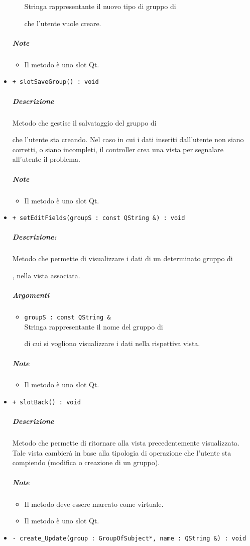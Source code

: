 \begin{itemize}
\begin{itemize}
\color{black} Stringa rappresentante il nuovo tipo di gruppo di \subject{} che l'utente vuole creare.
			\end{itemize}
			\subparagraph{Note}
			\begin{itemize}
				\item Il metodo è uno slot\g{} Qt\g{}.
			\end{itemize}
			\item \color{blue} \verb!+ slotSaveGroup() : void!
			\color{black}
			\subparagraph{Descrizione} Metodo che gestise il salvataggio del gruppo di \subject{} che l'utente sta creando. Nel caso in cui i dati inseriti dall'utente non siano corretti, o siano incompleti, il controller crea una vista per segnalare all'utente il problema.
			\subparagraph{Note}
			\begin{itemize}
				\item Il metodo è uno slot\g{} Qt\g{}.
			\end{itemize}
			\item \color{blue} \verb!+ setEditFields(groupS : const QString &) : void!
			\color{black}
			\subparagraph{Descrizione:} Metodo che permette di visualizzare i dati di un determinato gruppo di \subject{}, nella vista associata.
			\color{black}
			\subparagraph{Argomenti}
			\begin{itemize}
				\item \color{RoyalPurple} \verb!groupS : const QString &!\\				
\color{black} Stringa rappresentante il nome del gruppo di \subject{} di cui si vogliono visualizzare i dati nella rispettiva vista.
			\end{itemize}
			\subparagraph{Note}
			\begin{itemize}
				\item Il metodo è uno slot\g{} Qt\g{}.
			\end{itemize}
			\item \color{blue} \verb!+ slotBack() : void!
			\color{black}
			\subparagraph{Descrizione} Metodo che permette di ritornare alla vista precedentemente visualizzata. Tale vista cambierà in base alla tipologia di operazione che l'utente sta compiendo (modifica o creazione di un gruppo).
			\subparagraph{Note}
			\begin{itemize}
				\item Il metodo deve essere marcato come virtuale.
				\item Il metodo è uno slot\g{} Qt\g{}.
			\end{itemize}
			\item \color{blue} \verb!- create_Update(group : GroupOfSubject*, name : QString &) : void!

\end{itemize}
